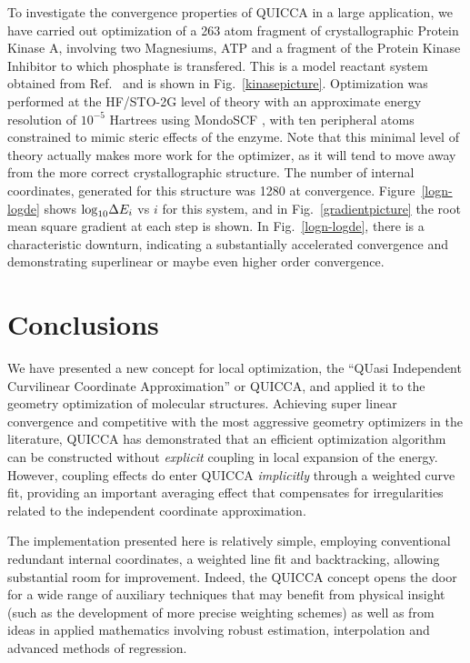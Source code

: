 \documentclass[prl,twocolumn,showpacs,twocolumngrid,superbib]{revtex4}
\begin{document}
To investigate the convergence properties of QUICCA in a large application, we have carried out
optimization of a 263 atom fragment of crystallographic Protein Kinase A, involving two Magnesiums, 
ATP and a fragment of the Protein Kinase Inhibitor to which phosphate is transfered. This is a
model reactant system obtained from Ref.~ and is shown in 
Fig.~\ref{kinasepicture}.   Optimization was performed at the HF/STO-2G level of theory with an 
approximate energy resolution of $10^{-5}$ Hartrees using MondoSCF \cite{MondoSCF}, with ten peripheral atoms 
constrained to mimic steric effects of the enzyme.  Note that this minimal level of theory actually 
makes more work for the optimizer, as it will tend to move away from the more correct crystallographic 
structure. The number of internal coordinates, generated for this structure
was 1280 at convergence.
Figure~\ref{logn-logde} shows ${\rm log}_{10} \Delta E_i$ vs $i$ for this system, and in 
Fig.~\ref{gradientpicture} the root mean square gradient at each step is shown.   
In Fig.~\ref{logn-logde}, there is a characteristic downturn, indicating
a substantially accelerated convergence and demonstrating superlinear
or maybe even higher order convergence.


\section{Conclusions}

We have presented a new concept for local optimization, the ``QUasi Independent Curvilinear 
Coordinate Approximation'' or  QUICCA, and applied it to the geometry optimization of molecular 
structures. Achieving super linear convergence and competitive with the most aggressive geometry 
optimizers in the literature, QUICCA has demonstrated that an efficient optimization algorithm 
can be constructed without {\em explicit} coupling in local expansion of the energy.  
However, coupling effects do enter QUICCA {\em implicitly} through a weighted curve fit, 
providing an important averaging effect that compensates for irregularities related
to the independent coordinate approximation.  

The implementation presented here is relatively simple, employing conventional redundant
internal coordinates, a weighted line fit and backtracking, allowing  substantial room for 
improvement.  Indeed, the QUICCA concept opens the door for a wide range of auxiliary techniques 
that may benefit from physical insight (such as the development of more precise weighting schemes) 
as well as from ideas in applied mathematics involving robust estimation, interpolation and 
advanced methods of regression.  
\end{document}
